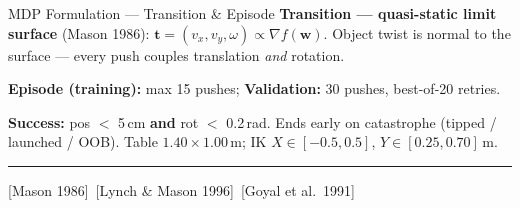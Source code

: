 \documentclass[aspectratio=169,xcolor=dvipsnames,t]{beamer}
\newcommand{\litfooter}[1]{%
  \vspace{2pt}%
  \hrule%
  \vspace{2pt}%
  {\tiny\color{LightDarkGrey} #1}%
}
\begin{document}
\begin{frame}[t]{MDP Formulation — Transition \& Episode}
  \small
  \textbf{Transition — quasi-static limit surface} (Mason 1986): $\mathbf{t} = (v_x, v_y, \omega) \propto \nabla f(\mathbf{w})$. Object twist is normal to the surface — every push couples translation \emph{and} rotation.

  \vspace{4pt}
  \textbf{Episode (training):} max 15 pushes; \textbf{Validation:} 30 pushes, best-of-20 retries.

  \textbf{Success:} pos $<$ 5\,cm \textbf{and} rot $<$ 0.2\,rad.  Ends early on catastrophe (tipped / launched / OOB).  Table $1.40\times1.00$\,m; IK $X\!\in\![-0.5,0.5]$, $Y\!\in\![0.25,0.70]$\,m.

  \vfill\litfooter{[Mason 1986]~[Lynch \& Mason 1996]~[Goyal et al.\ 1991]}
\end{frame}

\end{document}
